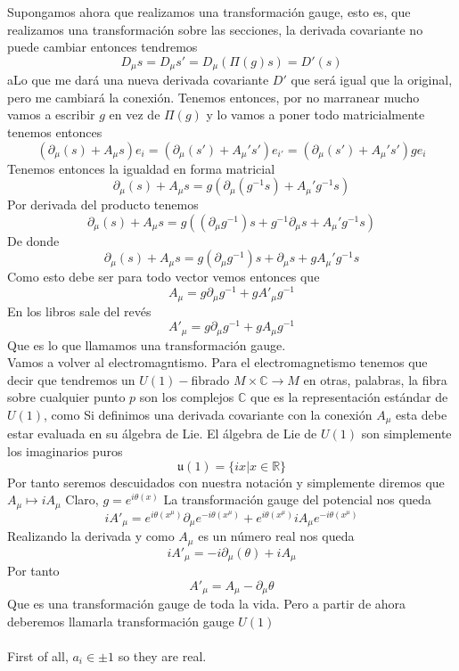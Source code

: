 \documentclass[12pt]{article}
\begin{document}
Supongamos ahora que realizamos una transformación gauge, esto es, que realizamos una transformación sobre las secciones, la derivada covariante no puede cambiar entonces tendremos
\begin{equation}
    D_\mu s = D_\mu s' =D_\mu (\Pi(g) s) =D'(s)
\end{equation}
aLo que me dará una nueva derivada covariante $D'$ que será igual que la original, pero me cambiará la conexión. Tenemos entonces, por no marranear mucho vamos a escribir $g$ en vez de $\Pi(g)$ y lo vamos a poner todo matricialmente tenemos entonces
$$(\partial_\mu (s)+A_\mu s)e_i = (\partial_\mu (s')+A_\mu 's')e_{i'} = (\partial_\mu (s')+A_\mu 's')g e_i $$
Tenemos entonces la igualdad en forma matricial
$$\partial_\mu (s)+A_\mu s = g (\partial_\mu (g^{-1}s)+A_\mu ' g^{-1}s)$$
Por derivada del producto tenemos
$$\partial_\mu (s)+A_\mu s = g((\partial_\mu g^{-1})s+ g^{-1} \partial_\mu s+A_\mu ' g^{-1}s)$$
De donde 
$$\partial_\mu (s)+A_\mu s = g(\partial_\mu g^{-1})s+  \partial_\mu s+ g A_\mu ' g^{-1}s $$
Como esto debe ser para todo vector vemos entonces que
\begin{equation}
    A_\mu =g\partial_\mu g^{-1} +g A'_\mu g^{-1} 
\end{equation}
En los libros sale del revés
\begin{equation}
    A'_\mu =g\partial_\mu g^{-1} +g A_\mu g^{-1} 
\end{equation}
Que es lo que llamamos una transformación gauge. \\
Vamos a volver al electromagntismo. Para el electromagnetismo tenemos que decir que tendremos un $U(1)-$fibrado $M\times \mathbb{C}\rightarrow M$ en otras, palabras, la fibra sobre cualquier punto $p$ son los complejos $\mathbb{C}$ que es la representación estándar de $U(1)$, como Si definimos una derivada covariante con la conexión $A_\mu$ esta debe estar evaluada en su álgebra de Lie.
El álgebra de Lie de $U(1)$ son simplemente los imaginarios puros 
\begin{equation}
    \mathfrak{u}(1)=\{ix| x\in \mathbb{R}\}
\end{equation}
Por tanto seremos descuidados con nuestra notación y simplemente diremos que 
$A_\mu \mapsto i A_\mu$
Claro, $g=e^{i\theta(x)}$ La transformación gauge del potencial nos queda
\begin{equation}
    iA'_\mu = e^{i \theta(x^\mu)}\partial_\mu e^{-i\theta(x^\mu)} + e^{i \theta(x^\mu)}iA_\mu e^{-i\theta(x^\mu)} 
\end{equation}
Realizando la derivada y como $A_\mu$ es un número real nos queda
\begin{equation}
    iA'_\mu = -i\partial_\mu (\theta) +i A_\mu 
\end{equation}
Por tanto
\begin{equation}
    A'_\mu =A_\mu - \partial_\mu \theta
\end{equation}
Que es una transformación gauge de toda la vida. Pero a partir de ahora deberemos llamarla transformación gauge $U(1)$\\\\
\noindent 
First of all, $a_i \in {\pm 1}$ so they are real. 
\end{document}
